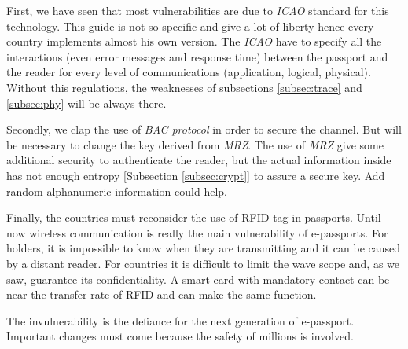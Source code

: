 \documentclass{acm_proc_article-sp}
\begin{document}
First, we have seen that most vulnerabilities are due to \emph{ICAO} standard for this technology. This guide is not so specific and give a lot of liberty hence every country implements almost his own version. The \emph{ICAO} have to specify all the interactions (even error messages and response time)  between the passport and the reader for every level of communications (application, logical, physical). Without this regulations, the weaknesses of subsections \ref{subsec:trace} and \ref{subsec:phy} will be always there.

Secondly, we clap the use of \emph{BAC protocol} in order to secure the channel. But will be necessary to change the key derived from \emph{MRZ}. The use of \emph{MRZ} give some additional security to authenticate the reader, but the actual information inside has not enough entropy [Subsection \ref{subsec:crypt}] to assure a secure key. Add random alphanumeric information could help.

Finally, the countries must reconsider the use of RFID tag in passports. Until now wireless communication is really the main vulnerability of e-passports. For holders, it is impossible to know when they are transmitting and it can be caused by a distant reader. For countries it is difficult to limit the wave scope and, as we saw, guarantee its confidentiality. A smart card with mandatory contact can be near the transfer rate of RFID and can make the same function.

The invulnerability is the defiance for the next generation of e-passport. Important changes must come because the safety of millions is involved. 


%
%

\balancecolumns
\end{document}

